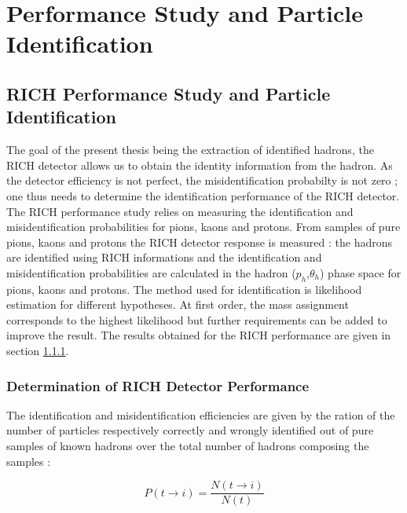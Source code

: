 
\chapter{Performance Study and Particle Identification}
\label{ch:PID} %



\section{RICH Performance Study and Particle Identification}

The goal of the present thesis being the extraction of identified hadrons, the RICH detector allows us to obtain the identity information from the hadron.
As the detector efficiency is not perfect, the misidentification probabilty is not zero ; one thus needs to determine the identification performance of the
RICH detector.
The RICH performance study relies on measuring the identification and misidentification probabilities for pions, kaons and protons. From samples of pure pions,
kaons and protons the RICH detector response is measured : the hadrons are identified using RICH informations and the identification and misidentification
probabilities are calculated in the hadron ($p_h$,$\theta_h$) phase space for pions, kaons and protons. The method used for identification is likelihood estimation
for different hypotheses. At first order, the mass assignment corresponds to the highest likelihood but further requirements can be added to improve the result.
The results obtained for the RICH performance are given in section \ref{}.

\subsection{Determination of RICH Detector Performance}

The identification and misidentification efficiencies are given by the ration of the number of particles respectively correctly and wrongly identified out of pure
samples of known hadrons over the total number of hadrons composing the samples :

\begin{equation}
    P(t \rightarrow i) = \frac{N(t \rightarrow i)}{N(t)}
\end{equation}

